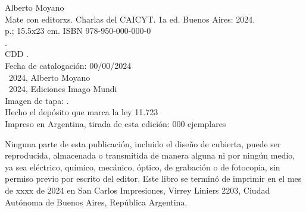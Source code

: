 \noindent Alberto Moyano \\
\noindent Mate con editorxs. Charlas del CAICYT. 1a ed. Buenos Aires: 2024.\\
 p.; 15.5x23 cm. ISBN 978-950-000-000-0 \\
. \\
\noindent CDD .\\
\noindent Fecha de catalogación: 00/00/2024 \\
\noindent \textcopyright~2024, Alberto Moyano \\
\noindent \textcopyright~2024, Ediciones Imago Mundi\\
\noindent Imagen de tapa: .\\
\noindent Hecho el depósito que marca la ley 11.723\\
\noindent Impreso en Argentina, tirada de esta edición: 000 ejemplares\\

\vfill

\noindent Ninguna parte de esta publicación, incluido el diseño de cubierta, puede ser reproducida, almacenada o transmitida de manera alguna ni por ningún medio, ya sea eléctrico, químico, mecánico, óptico, de grabación o de fotocopia, sin permiso previo por escrito del editor. Este libro se terminó de imprimir en el mes de xxxx de 2024 en San Carlos Impresiones, Virrey Liniers 2203, Ciudad Autónoma de Buenos Aires, República Argentina.
